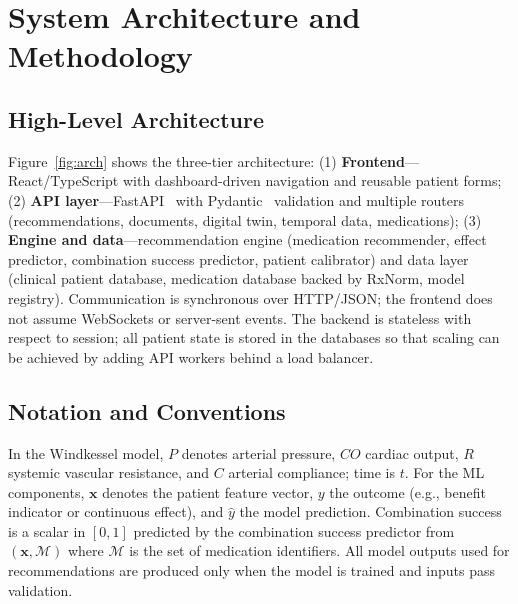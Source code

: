 \documentclass[conference]{IEEEtran}
\begin{document}
\section{System Architecture and Methodology}

\subsection{High-Level Architecture}
Figure~\ref{fig:arch} shows the three-tier architecture: (1) \textbf{Frontend}---React/TypeScript with dashboard-driven navigation and reusable patient forms; (2) \textbf{API layer}---FastAPI~\cite{fastapi} with Pydantic~\cite{pydantic} validation and multiple routers (recommendations, documents, digital twin, temporal data, medications); (3) \textbf{Engine and data}---recommendation engine (medication recommender, effect predictor, combination success predictor, patient calibrator) and data layer (clinical patient database, medication database backed by RxNorm, model registry). Communication is synchronous over HTTP/JSON; the frontend does not assume WebSockets or server-sent events. The backend is stateless with respect to session; all patient state is stored in the databases so that scaling can be achieved by adding API workers behind a load balancer.

\subsection{Notation and Conventions}
In the Windkessel model, $P$ denotes arterial pressure, $CO$ cardiac output, $R$ systemic vascular resistance, and $C$ arterial compliance; time is $t$. For the ML components, $\mathbf{x}$ denotes the patient feature vector, $y$ the outcome (e.g., benefit indicator or continuous effect), and $\hat{y}$ the model prediction. Combination success is a scalar in $[0,1]$ predicted by the combination success predictor from $(\mathbf{x}, \mathcal{M})$ where $\mathcal{M}$ is the set of medication identifiers. All model outputs used for recommendations are produced only when the model is trained and inputs pass validation.
\end{document}
